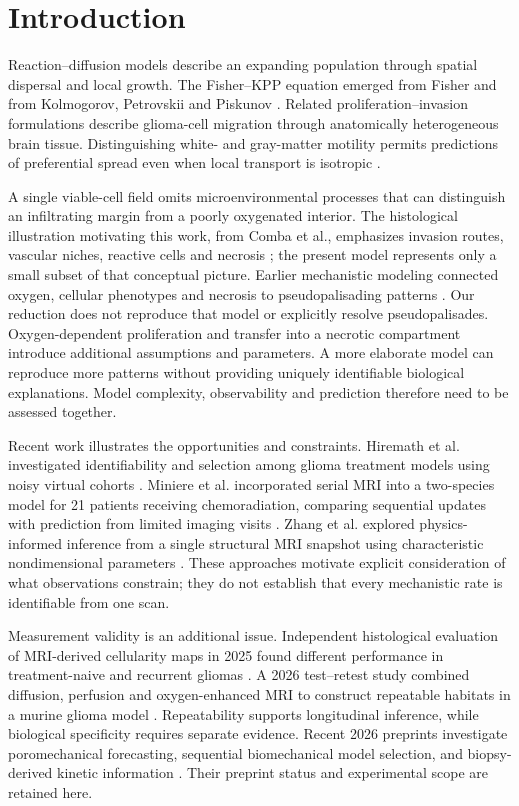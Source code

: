 \section{Introduction}
Reaction--diffusion models describe an expanding population through spatial dispersal and local growth. The Fisher--KPP equation emerged from Fisher and from Kolmogorov, Petrovskii and Piskunov \citep{fisher1937,kpp1937}. Related proliferation--invasion formulations describe glioma-cell migration through anatomically heterogeneous brain tissue. Distinguishing white- and gray-matter motility permits predictions of preferential spread even when local transport is isotropic \citep{swanson2000}.

A single viable-cell field omits microenvironmental processes that can distinguish an infiltrating margin from a poorly oxygenated interior. The histological illustration motivating this work, from Comba et al., emphasizes invasion routes, vascular niches, reactive cells and necrosis \citep{comba2021}; the present model represents only a small subset of that conceptual picture. Earlier mechanistic modeling connected oxygen, cellular phenotypes and necrosis to pseudopalisading patterns \citep{martinez2012}. Our reduction does not reproduce that model or explicitly resolve pseudopalisades. Oxygen-dependent proliferation and transfer into a necrotic compartment introduce additional assumptions and parameters. A more elaborate model can reproduce more patterns without providing uniquely identifiable biological explanations. Model complexity, observability and prediction therefore need to be assessed together.

Recent work illustrates the opportunities and constraints. Hiremath et al. investigated identifiability and selection among glioma treatment models using noisy virtual cohorts \citep{hiremath2025}. Miniere et al. incorporated serial MRI into a two-species model for 21 patients receiving chemoradiation, comparing sequential updates with prediction from limited imaging visits \citep{miniere2025}. Zhang et al. explored physics-informed inference from a single structural MRI snapshot using characteristic nondimensional parameters \citep{zhang2025}. These approaches motivate explicit consideration of what observations constrain; they do not establish that every mechanistic rate is identifiable from one scan.

Measurement validity is an additional issue. Independent histological evaluation of MRI-derived cellularity maps in 2025 found different performance in treatment-naive and recurrent gliomas \citep{nocera2025}. A 2026 test--retest study combined diffusion, perfusion and oxygen-enhanced MRI to construct repeatable habitats in a murine glioma model \citep{das2026}. Repeatability supports longitudinal inference, while biological specificity requires separate evidence. Recent 2026 preprints investigate poromechanical forecasting, sequential biomechanical model selection, and biopsy-derived kinetic information \citep{andaloussi2026,noman2026,hofmann2026}. Their preprint status and experimental scope are retained here.


